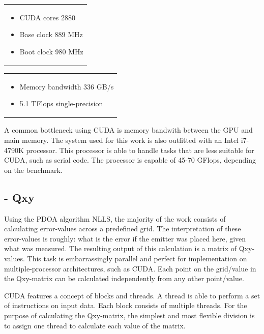 \documentclass[10pt,a4paper]{book}
\begin{document}
\begin{tabular}[t]{@{}>{\raggedright\arraybackslash}p{}}
\begin{itemize}
\item \gls{CUDA} cores 2880
\item Base clock 889 MHz
\item Boot clock 980 MHz
\end{itemize}
\end{tabular}
\begin{tabular}[t]{@{}>{\raggedright\arraybackslash}p{}@{}}
\begin{itemize}
\item Memory bandwidth 336 GB/s
\item 5.1 TFlops single-precision
\end{itemize}
\end{tabular}


A common bottleneck using \gls{CUDA} is memory bandwith between the \gls{GPU} and main memory. The system used for this work is also outfitted with an Intel i7-4790K processor. This processor is able to handle tasks that are less suitable for \gls{CUDA}, such as serial code. The processor is capable of 45-70 GFlops, depending on the benchmark.





\subsection{  - Qxy}

Using the \gls{PDOA} algorithm \gls{NLLS}, the majority of the work consists of calculating error-values across a predefined grid. The interpretation of these error-values is roughly: what is the error if the emitter was placed here, given what was measured. The resulting output of this calculation is a matrix of Qxy-values. This task is embarrassingly parallel and perfect for implementation on multiple-processor architectures, such as \gls{CUDA}. Each point on the grid/value in the Qxy-matrix can be calculated independently from any other point/value.

\gls{CUDA} features a concept of blocks and threads. A thread is able to perform a set of instructions on input data. Each block consists of multiple threads. For the purpose of calculating the Qxy-matrix, the simplest and most flexible division is to assign one thread to calculate each value of the matrix. 
\end{document}
